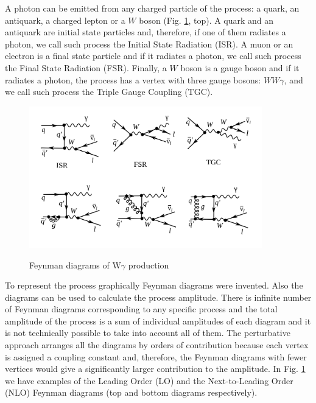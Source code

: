 
A photon can be emitted from any charged particle of the process: a quark, an antiquark, a charged lepton or a $W$ boson (Fig. \ref{fig:feynmWg_LO_NLO}, top). A quark and an antiquark are initial state particles and, therefore, if one of them radiates a photon, we call such process the Initial State Radiation (ISR). A muon or an electron is a final state particle and if it radiates a photon, we call such process the Final State Radiation (FSR). Finally, a $W$ boson is a gauge boson and if it radiates a photon, the process has a vertex with three gauge bosons: $WW\gamma$, and we call such process the Triple Gauge Coupling (TGC).\\

\begin{figure}[htb]
  \begin{center}
    {\includegraphics[width=0.90\textwidth]{../figs/WgAbout/feynmWg_LO_NLO.png}}
    \caption{Feynman diagrams of W$\gamma$ production}
    \label{fig:feynmWg_LO_NLO}
  \end{center}
\end{figure}

To represent the process graphically Feynman diagrams were invented. Also the diagrams can be used to calculate the process amplitude. There is infinite number of Feynman diagrams corresponding to any specific process and the total amplitude of the process is a sum of individual amplitudes of each diagram and it is not technically possible to take into account all of them. The perturbative approach arranges all the diagrams by orders of contribution because each vertex is assigned a coupling constant and, therefore, the Feynman diagrams with fewer vertices would give a significantly larger contribution to the amplitude. In Fig. \ref{fig:feynmWg_LO_NLO} we have examples of the Leading Order (LO) and the Next-to-Leading Order (NLO) Feynman diagrams (top and bottom diagrams respectively).\\

